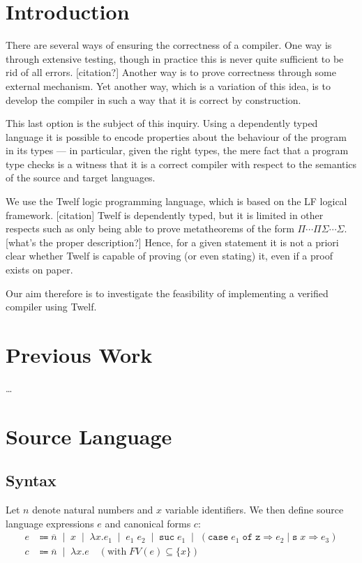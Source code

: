 \documentclass[12pt]{article}
\newcommand{\alt}{\;\; | \;\;}
\newcommand{\defi}{\Coloneqq}
\newcommand{\set}[1]{\{#1\}}
\newcommand{\z}{\mathtt{z}}
\newcommand{\suc}{\mathtt{s} \;}
\newcommand{\n}[1]{\overline{#1}}
\newcommand{\lam}[2]{\lambda #1. #2}
\newcommand{\app}{\;}
\newcommand{\hsuc}[1]{\mathtt{suc} \; #1}
\newcommand{\hcase}[3]{\mathtt{case} \; #1 \; \mathtt{of} \; \z \Rightarrow #2 \; | \; \suc{x} \Rightarrow #3}
\newcommand{\e}{e} %
\renewcommand{\c}{c} %
\begin{document}
\section*{Introduction}

There are several ways of ensuring the correctness of a compiler.
One way is through extensive testing, though in practice this is never quite sufficient to be rid of all errors. [citation?]
Another way is to prove correctness through some external mechanism.
Yet another way, which is a variation of this idea, is to develop the compiler in such a way that it is correct by construction.

This last option is the subject of this inquiry.
Using a dependently typed language it is possible to encode properties about the behaviour of the program in its types --- in particular, given the right types, the mere fact that a program type checks is a witness that it is a correct compiler with respect to the semantics of the source and target languages.

We use the Twelf logic programming language, which is based on the LF logical framework. [citation]
Twelf is dependently typed, but it is limited in other respects such as only being able to prove metatheorems of the form $\Pi \cdots \Pi \Sigma \cdots \Sigma$. [what's the proper description?]
Hence, for a given statement it is not a priori clear whether Twelf is capable of proving (or even stating) it, even if a proof exists on paper.

Our aim therefore is to investigate the feasibility of implementing a verified compiler using Twelf.

\section*{Previous Work}

\ldots

\section*{Source Language}            

\subsection*{Syntax}

Let $n$ denote natural numbers and $x$ variable identifiers. We then define source language expressions $\e$ and canonical forms $\c$:
\begin{align*}
  \e &\defi \n{n} \alt x \alt \lam{x}{\e_1} \alt \e_1 \app \e_2 \alt \hsuc{\e_1} \alt (\hcase{\e_1}{\e_2}{\e_3}) \\
  \c &\defi \n{n} \alt \lam{x}{\e} \quad (\text{with} \; FV(\e) \subseteq \set{x}) \\
\end{align*}
\end{document}
